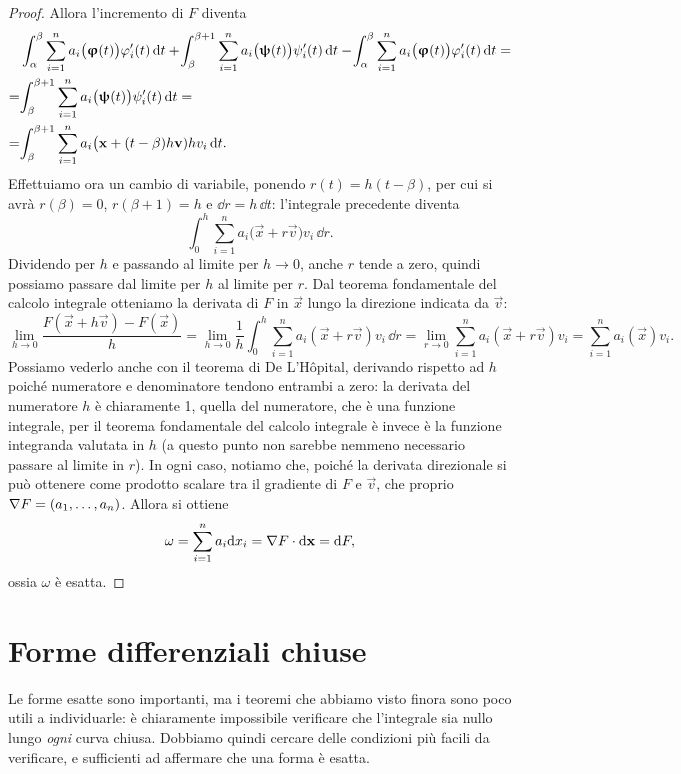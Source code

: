 \begin{proof}
	Allora l'incremento di $F$ diventa
	\begin{equation}
		\begin{aligned}
			&\int_\alpha^\beta\sum_{i=1}^na_i\big(\bm{\upvarphi}(t)\big)\varphi_i'(t)\,\textup{d} t+\!\int_\beta^{\beta+1}\sum_{i=1}^na_i\big(\bm{\uppsi}(t)\big)\psi_i'(t)\,\textup{d} t-\!\int_\alpha^\beta\sum_{i=1}^na_i\big(\bm{\upvarphi}(t)\big)\varphi_i'(t)\,\textup{d} t=\\
			=&\!\int_\beta^{\beta+1}\sum_{i=1}^na_i\big(\bm{\uppsi}(t)\big)\psi_i'(t)\,\textup{d} t=\\
			=&\!\int_\beta^{\beta+1}\sum_{i=1}^na_i\big(\mathbf{x}+(t-\beta)h\mathbf{v})hv_i\,\textup{d} t.
		\end{aligned}
	\end{equation}
	Effettuiamo ora un cambio di variabile, ponendo $r(t)=h(t-\beta)$, per cui si avrà $r(\beta)=0$, $r(\beta+1)=h$ e $\dd r=h\,\dd t$: l'integrale precedente diventa
	\begin{equation}
		\int_0^h\sum_{i=1}^na_i\big(\vec x+r\vec v)v_i\,\dd r.
	\end{equation}
	Dividendo per $h$ e passando al limite per $h\to0$, anche $r$ tende a zero, quindi possiamo passare dal limite per $h$ al limite per $r$.
	Dal teorema fondamentale del calcolo integrale otteniamo la derivata di $F$ in $\vec x$ lungo la direzione indicata da $\vec v$:
	\begin{equation}
		\lim_{h\to0}\frac{F(\vec x+h\vec v)-F(\vec x)}{h}=\lim_{h\to0}\frac1{h}\int_0^h\sum_{i=1}^na_i(\vec x+r\vec v)v_i\,\dd r=\lim_{r\to 0}\sum_{i=1}^na_i(\vec x+r\vec v)v_i=\sum_{i=1}^na_i(\vec x)v_i.
	\end{equation}
	Possiamo vederlo anche con il teorema di De L'H\^opital, derivando rispetto ad $h$ poich\'e numeratore e denominatore tendono entrambi a zero: la derivata del numeratore $h$ è chiaramente 1, quella del numeratore, che è una funzione integrale, per il teorema fondamentale del calcolo integrale è invece è la funzione integranda valutata in $h$ (a questo punto non sarebbe nemmeno necessario passare al limite in $r$).
	In ogni caso, notiamo che, poiché la derivata direzionale si può ottenere come prodotto scalare tra il gradiente di $F$ e $\vec v$, che proprio $\nabla F=(a_1,\dots,a_n)$.
	Allora si ottiene
	\begin{equation}
		\omega=\sum_{i=1}^na_i\textup{d} x_i={\nabla F}\cdot{\textup{d}\mathbf{x}}=\textup{d} F,
	\end{equation}
	ossia $\omega$ è esatta.
\end{proof}

\section{Forme differenziali chiuse}
Le forme esatte sono importanti, ma i teoremi che abbiamo visto finora sono poco utili a individuarle: è chiaramente impossibile verificare che l'integrale sia nullo lungo \emph{ogni} curva chiusa.
Dobbiamo quindi cercare delle condizioni più facili da verificare, e sufficienti ad affermare che una forma è esatta.

